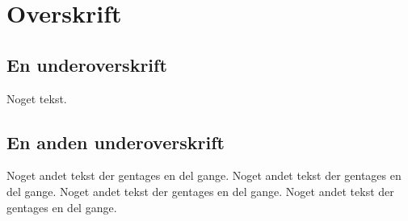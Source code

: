 \documentclass{article}
\begin{document}
\tableofcontents
\section{Overskrift}

\subsection{En underoverskrift}
Noget tekst.

\subsection{En anden underoverskrift}
Noget andet tekst der gentages en del gange.
Noget andet tekst der gentages en del gange.
Noget andet tekst der gentages en del gange.
Noget andet tekst der gentages en del gange.
\end{document}
